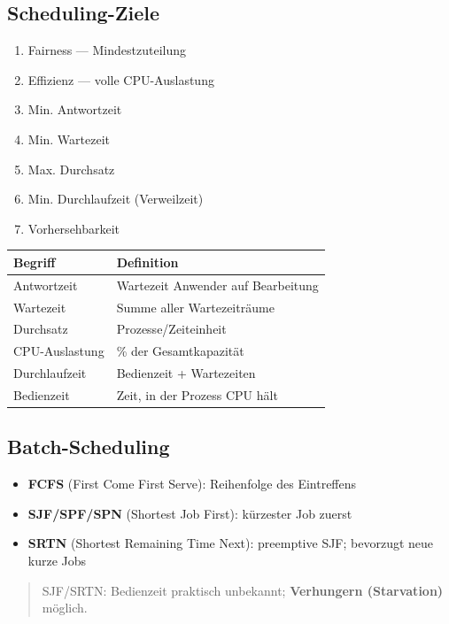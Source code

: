\documentclass[11pt, a4paper]{article}
\begin{document}
\subsection{Scheduling-Ziele}
\begin{enumerate}
  \item Fairness — Mindestzuteilung
  \item Effizienz — volle CPU-Auslastung
  \item Min. Antwortzeit
  \item Min. Wartezeit
  \item Max. Durchsatz
  \item Min. Durchlaufzeit (Verweilzeit)
  \item Vorhersehbarkeit
\end{enumerate}


{\small
\begin{tabularx}{\linewidth}{XX}
\hline
\rowcolor{tableheadbg}
{\color{white}\textbf{Begriff}} & {\color{white}\textbf{Definition}} \\[2pt]
\hline
\endhead
\hline
\endfoot
Antwortzeit & Wartezeit Anwender auf Bearbeitung \\
Wartezeit & Summe aller Wartezeiträume \\
Durchsatz & Prozesse/Zeiteinheit \\
CPU-Auslastung & \% der Gesamtkapazität \\
Durchlaufzeit & Bedienzeit + Wartezeiten \\
Bedienzeit & Zeit, in der Prozess CPU hält \\
\end{tabularx}
}



\subsection{Batch-Scheduling}
\begin{itemize}
  \item \textbf{FCFS} (First Come First Serve): Reihenfolge des Eintreffens
  \item \textbf{SJF/SPF/SPN} (Shortest Job First): kürzester Job zuerst
  \item \textbf{SRTN} (Shortest Remaining Time Next): preemptive SJF; bevorzugt neue kurze Jobs
\end{itemize}

\begin{quote}
SJF/SRTN: Bedienzeit praktisch unbekannt; \textbf{Verhungern (Starvation)} möglich.
\end{quote}
\end{document}
